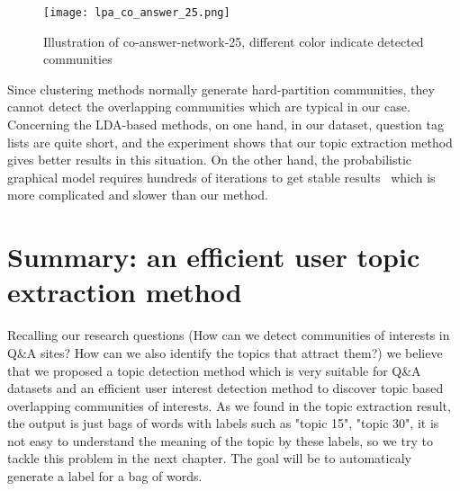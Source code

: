 \begin{figure}[htp]
\centering
\texttt{[image: lpa\_co\_answer\_25.png]}  %
\caption{Illustration of co-answer-network-25, different color indicate detected communities}
\label{fig:co-answer-network-25} %
\end{figure}
Since clustering methods normally generate hard-partition communities, they cannot detect the overlapping communities which are typical in our case. Concerning the LDA-based methods, on one hand, in our dataset, question tag lists are quite short, and the experiment shows that our topic extraction method gives better results in this situation. On the other hand, the probabilistic graphical model requires hundreds of iterations to get stable results~\cite{griffiths2004finding} which is more complicated and slower than our method. 

\section{Summary: an efficient user topic extraction method}
Recalling our research questions (How can we detect communities of interests in Q\&A sites? How can we also identify the topics that attract them?) we believe that we proposed a topic detection method which is very suitable for Q\&A datasets and an efficient user interest detection method to discover topic based overlapping communities of interests. As we found in the topic extraction result, the output is just bags of words with labels such as "topic 15", "topic 30", it is not easy to understand the meaning of the topic by these labels, so we try to tackle this problem in the next chapter. The goal will be to automaticaly generate a label for a bag of words.


